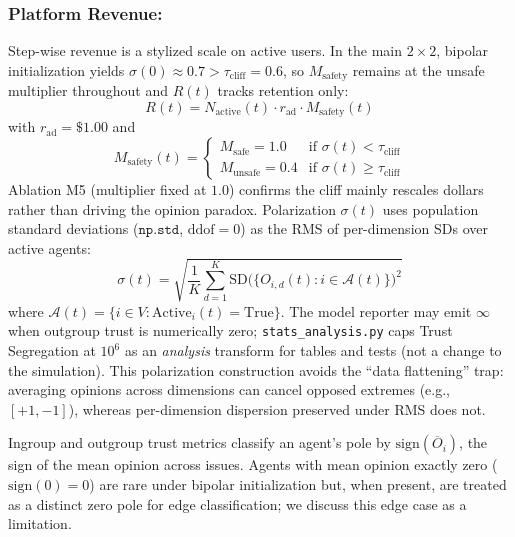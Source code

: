 \subsubsection{Platform Revenue:} Step-wise revenue is a stylized scale on active users. In the main $2\times2$, bipolar initialization yields $\sigma(0)\approx 0.7 > \tau_{\text{cliff}}=0.6$, so $M_{\text{safety}}$ remains at the unsafe multiplier throughout and $R(t)$ tracks retention only:
\begin{equation}
    R(t) = N_{\text{active}}(t) \cdot r_{\text{ad}} \cdot M_{\text{safety}}(t)
\end{equation}
with $r_{\text{ad}} = \$1.00$ and
\begin{equation}
    M_{\text{safety}}(t) = \begin{cases}
        M_{\text{safe}} = 1.0 & \text{if } \sigma(t) < \tau_{\text{cliff}} \\
        M_{\text{unsafe}} = 0.4 & \text{if } \sigma(t) \geq \tau_{\text{cliff}}
    \end{cases}
\end{equation}
Ablation M5 (multiplier fixed at $1.0$) confirms the cliff mainly rescales dollars rather than driving the opinion paradox. Polarization $\sigma(t)$ uses population standard deviations ($\mathtt{np.std}$, $\mathrm{ddof}=0$) as the RMS of per-dimension SDs over active agents:
\begin{equation}
    \sigma(t) = \sqrt{\frac{1}{K} \sum_{d=1}^K \mathrm{SD}\Big(\{O_{i,d}(t) : i \in \mathcal{A}(t)\}\Big)^2}
\end{equation}
where $\mathcal{A}(t) = \{i \in V : \text{Active}_i(t) = \text{True}\}$. The model reporter may emit $\infty$ when outgroup trust is numerically zero; \texttt{stats\_analysis.py} caps Trust Segregation at $10^{6}$ as an \emph{analysis} transform for tables and tests (not a change to the simulation). This polarization construction avoids the ``data flattening'' trap: averaging opinions across dimensions can cancel opposed extremes (e.g., $[+1,-1]$), whereas per-dimension dispersion preserved under RMS does not.

Ingroup and outgroup trust metrics classify an agent's pole by $\mathrm{sign}(\overline{O}_i)$, the sign of the mean opinion across issues. Agents with mean opinion exactly zero ($\mathrm{sign}(0)=0$) are rare under bipolar initialization but, when present, are treated as a distinct zero pole for edge classification; we discuss this edge case as a limitation.


